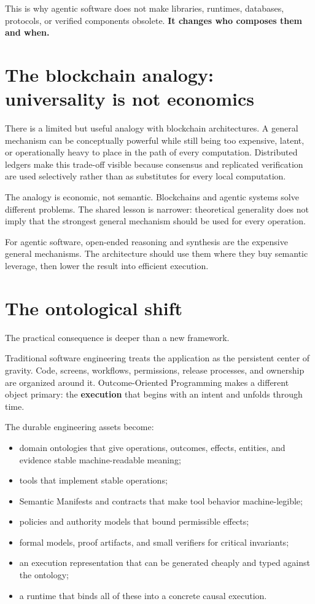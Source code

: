 \documentclass[10pt,oneside,openany]{book}
\newcommand{\term}[1]{\textbf{#1}}
\begin{document}
This is why agentic software does not make libraries, runtimes, databases, protocols, or verified components obsolete. \textbf{It changes who composes them and when.}

\section{The blockchain analogy: universality is not economics}

There is a limited but useful analogy with blockchain architectures. A general mechanism can be conceptually powerful while still being too expensive, latent, or operationally heavy to place in the path of every computation. Distributed ledgers make this trade-off visible because consensus and replicated verification are used selectively rather than as substitutes for every local computation.

The analogy is economic, not semantic. Blockchains and agentic systems solve different problems. The shared lesson is narrower: theoretical generality does not imply that the strongest general mechanism should be used for every operation.

For agentic software, open-ended reasoning and synthesis are the expensive general mechanisms. The architecture should use them where they buy semantic leverage, then lower the result into efficient execution.

\section{The ontological shift}

The practical consequence is deeper than a new framework.

Traditional software engineering treats the application as the persistent center of gravity. Code, screens, workflows, permissions, release processes, and ownership are organized around it. Outcome-Oriented Programming makes a different object primary: the \term{execution} that begins with an intent and unfolds through time.

The durable engineering assets become:

\begin{itemize}
\item domain ontologies that give operations, outcomes, effects, entities, and evidence stable machine-readable meaning;
\item tools that implement stable operations;
\item Semantic Manifests and contracts that make tool behavior machine-legible;
\item policies and authority models that bound permissible effects;
\item formal models, proof artifacts, and small verifiers for critical invariants;
\item an execution representation that can be generated cheaply and typed against the ontology;
\item a runtime that binds all of these into a concrete causal execution.
\end{itemize}
\end{document}
